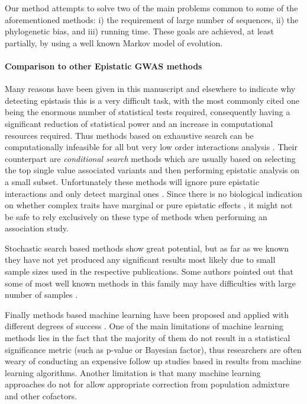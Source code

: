 Our method attempts to solve two of the main problems common to some of the aforementioned methods: 
i) the requirement of large number of sequences, 
ii) the phylogenetic bias, and
iii) running time.
These goals are achieved, at least partially, by using a well known Markov model of evolution.

\paragraph{Comparison to other Epistatic GWAS methods}
Many reasons have been given in this manuscript and elsewhere to indicate why detecting epistasis this is a very difficult task, with the most commonly cited one being the enormous number of statistical tests required, consequently having a significant reduction of statistical power and an increase in computational resources required.
Thus methods based on exhaustive search can be computationally infeasible for all but very low order interactions analysis \cite{cordell2009detecting}.
Their counterpart are \textit{conditional search} methods \cite{li2011detecting} which are usually based on selecting the top single value associated variants and then performing epistatic analysis on a small subset.
Unfortunately these methods will ignore pure epistatic interactions and only detect marginal ones \cite{li2011detecting,cordell2002epistasis}.
Since there is no biological indication on whether complex traits have marginal or pure epistatic effects \cite{culverhouse2002perspective,zuk2012mystery,li2011detecting}, it might not be safe to rely exclusively on these type of methods when performing an  association study.

Stochastic search based methods \cite{zhang2007bayesian} show great potential, but as far as we known they have not yet produced any significant results most likely due to small sample sizes used in the respective publications. 
Some authors pointed out that some of most well known methods in this family may have difficulties with large number of samples \cite{de2013emerging}.

Finally methods based machine learning have been proposed and applied with different degrees of success \cite{koo2013review, cordell2009detecting, li2011detecting}.
One of the main limitations of machine learning methods lies in the fact that the majority of them do not result in a statistical significance metric (such as p-value or Bayesian factor), thus researchers are often weary of conducting an expensive follow up studies based in results from machine learning algorithms.
Another limitation is that many machine learning approaches do not for allow appropriate correction from population admixture and other cofactors.

